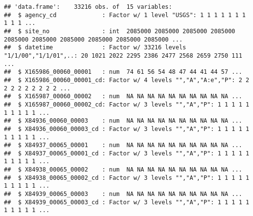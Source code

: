 \documentclass[]{article}
\newenvironment{Shaded}{\begin{snugshade}}{\end{snugshade}}
\newcommand{\KeywordTok}[1]{\textcolor[rgb]{0.13,0.29,0.53}{\textbf{#1}}}
\newcommand{\DataTypeTok}[1]{\textcolor[rgb]{0.13,0.29,0.53}{#1}}
\newcommand{\StringTok}[1]{\textcolor[rgb]{0.31,0.60,0.02}{#1}}
\newcommand{\OperatorTok}[1]{\textcolor[rgb]{0.81,0.36,0.00}{\textbf{#1}}}
\newcommand{\NormalTok}[1]{#1}
\begin{document}
\begin{Shaded}
\end{Shaded}

\begin{verbatim}
## 'data.frame':    33216 obs. of  15 variables:
##  $ agency_cd             : Factor w/ 1 level "USGS": 1 1 1 1 1 1 1 1 1 1 ...
##  $ site_no               : int  2085000 2085000 2085000 2085000 2085000 2085000 2085000 2085000 2085000 2085000 ...
##  $ datetime              : Factor w/ 33216 levels "1/1/00","1/1/01",..: 20 1021 2022 2295 2386 2477 2568 2659 2750 111 ...
##  $ X165986_00060_00001   : num  74 61 56 54 48 47 44 41 44 57 ...
##  $ X165986_00060_00001_cd: Factor w/ 4 levels "","A","A:e","P": 2 2 2 2 2 2 2 2 2 2 ...
##  $ X165987_00060_00002   : num  NA NA NA NA NA NA NA NA NA NA ...
##  $ X165987_00060_00002_cd: Factor w/ 3 levels "","A","P": 1 1 1 1 1 1 1 1 1 1 ...
##  $ X84936_00060_00003    : num  NA NA NA NA NA NA NA NA NA NA ...
##  $ X84936_00060_00003_cd : Factor w/ 3 levels "","A","P": 1 1 1 1 1 1 1 1 1 1 ...
##  $ X84937_00065_00001    : num  NA NA NA NA NA NA NA NA NA NA ...
##  $ X84937_00065_00001_cd : Factor w/ 3 levels "","A","P": 1 1 1 1 1 1 1 1 1 1 ...
##  $ X84938_00065_00002    : num  NA NA NA NA NA NA NA NA NA NA ...
##  $ X84938_00065_00002_cd : Factor w/ 3 levels "","A","P": 1 1 1 1 1 1 1 1 1 1 ...
##  $ X84939_00065_00003    : num  NA NA NA NA NA NA NA NA NA NA ...
##  $ X84939_00065_00003_cd : Factor w/ 3 levels "","A","P": 1 1 1 1 1 1 1 1 1 1 ...
\end{verbatim}
\end{document}
